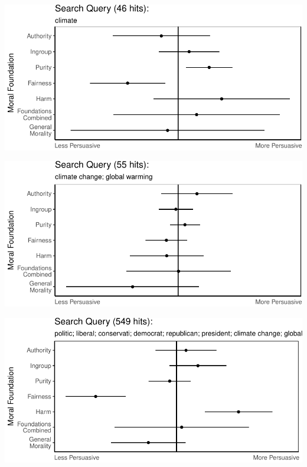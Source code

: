 \documentclass[11pt,]{article}
\begin{document}
\includegraphics{prelim_files/figure-latex/unnamed-chunk-19-1.pdf}

\includegraphics{prelim_files/figure-latex/unnamed-chunk-20-1.pdf}

\includegraphics{prelim_files/figure-latex/unnamed-chunk-21-1.pdf}




\newpage
\singlespacing 
\end{document}
